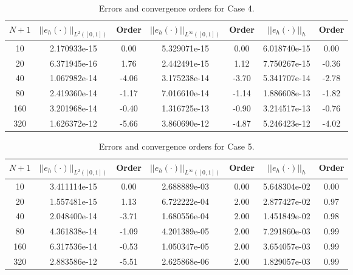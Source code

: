 \documentclass[a4paper, 12pt]{article}
\begin{document}
\begin{table}[!ht]
\caption{Errors and convergence orders for Case 4.}
\vspace{0.1in}
\centering
\begin{tabular}{|c|c|c| c| c| c| c|}
\hline
 $N+1$&  $||e_h(\cdot)||_{L^2([0,1])}$ & Order  & $||e_h(\cdot)||_{L^\infty([0,1])}$ & Order& $||e_h(\cdot)||_h$& Order \\
 \hline
     10  & 2.170933e-15 &  0.00 & 5.329071e-15 &  0.00 & 6.018740e-15  &  0.00\\
     20  & 6.371945e-16 &  1.76 & 2.442491e-15 &  1.12 & 7.750267e-15  & -0.36\\
     40  & 1.067982e-14 & -4.06 & 3.175238e-14 & -3.70 & 5.341707e-14  & -2.78\\
     80  & 2.419360e-14 & -1.17 & 7.016610e-14 & -1.14 & 1.886608e-13  & -1.82\\
     160 & 3.201968e-14 & -0.40 & 1.316725e-13 & -0.90 & 3.214517e-13  & -0.76\\
     320 & 1.626372e-12 & -5.66 & 3.860690e-12 & -4.87 & 5.246423e-12  & -4.02\\
\hline
\end{tabular}
\label{tab:C4}
\end{table}

\begin{table}[!ht]
\caption{Errors and convergence orders for Case 5.}
\vspace{0.1in}
\centering
\begin{tabular}{|c|c|c| c| c| c| c|}
\hline
 $N+1$&  $||e_h(\cdot)||_{L^2([0,1])}$ & Order  & $||e_h(\cdot)||_{L^\infty([0,1])}$ & Order& $||e_h(\cdot)||_h$& Order \\
 \hline
     10  & 3.411114e-15 &  0.00 & 2.688889e-03 & 0.00 & 5.648304e-02 & 0.00\\
     20  & 1.557481e-15 &  1.13 & 6.722222e-04 & 2.00 & 2.877427e-02 & 0.97\\
     40  & 2.048400e-14 & -3.71 & 1.680556e-04 & 2.00 & 1.451849e-02 & 0.98\\
     80  & 4.361838e-14 & -1.09 & 4.201389e-05 & 2.00 & 7.291860e-03 & 0.99\\
     160 & 6.317536e-14 & -0.53 & 1.050347e-05 & 2.00 & 3.654057e-03 & 0.99\\
     320 & 2.883586e-12 & -5.51 & 2.625868e-06 & 2.00 & 1.829057e-03 & 0.99\\
\hline
\end{tabular}
\label{tab:C5}
\end{table}
\end{document}
